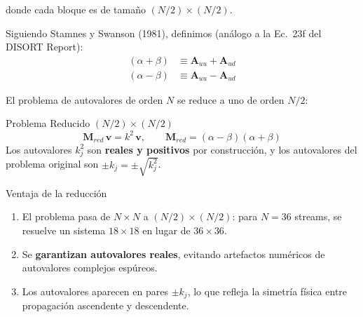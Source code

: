 \documentclass[a4paper,11pt]{article}
\begin{document}
donde cada bloque es de tama\~no $(N/2) \times (N/2)$.

Siguiendo Stamnes y Swanson (1981), definimos (an\'alogo a la Ec.\ 23f del DISORT Report):
\begin{align}
(\alpha + \beta) &\equiv \mathbf{A}_{uu} + \mathbf{A}_{ud} \label{eq:apb} \\
(\alpha - \beta) &\equiv \mathbf{A}_{uu} - \mathbf{A}_{ud} \label{eq:amb}
\end{align}

El problema de autovalores de orden $N$ se reduce a uno de orden $N/2$:

\begin{keyresult}{Problema Reducido $(N/2) \times (N/2)$}
\begin{equation}
\boxed{\mathbf{M}_{red} \, \mathbf{v} = k^2 \, \mathbf{v}, \qquad \mathbf{M}_{red} = (\alpha - \beta)(\alpha + \beta)}
\label{eq:reduced_eigen}
\end{equation}
Los autovalores $k_j^2$ son \textbf{reales y positivos} por construcci\'on, y los autovalores del problema original son $\pm k_j = \pm \sqrt{k_j^2}$.
\end{keyresult}

\begin{physics}{Ventaja de la reducci\'on}
\begin{enumerate}
\item El problema pasa de $N \times N$ a $(N/2) \times (N/2)$: para $N = 36$ streams, se resuelve un sistema $18 \times 18$ en lugar de $36 \times 36$.
\item Se \textbf{garantizan autovalores reales}, evitando artefactos num\'ericos de autovalores complejos esp\'ureos.
\item Los autovalores aparecen en pares $\pm k_j$, lo que refleja la simetr\'ia f\'isica entre propagaci\'on ascendente y descendente.
\end{enumerate}
\end{physics}
\end{document}
